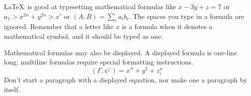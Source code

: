 \documentclass{article}
\newcommand{\ip}[2]{(#1, #2)}
\begin{document}
\LaTeX\ is good at typesetting mathematical formulas
like
       \( x-3y + z = 7 \)
or
       \( a_{1} > x^{2n} + y^{2n} > x' \)
or
       \( \ip{A}{B} = \sum_{i} a_{i} b_{i} \).
The spaces you type in a formula are
ignored.  Remember that a letter like
       $x$
is a formula when it denotes a mathematical
symbol, and it should be typed as one.

Mathematical formulas may also be displayed.  A
displayed formula
is
one-line long; multiline
formulas require special formatting instructions.
   \[  \ip{\Gamma}{\psi'} = x'' + y^{2} + z_{i}^{n}\]
Don't start a paragraph with a displayed equation,
nor make one a paragraph by itself.
\end{document}
